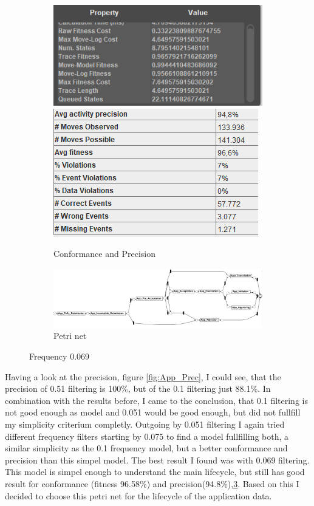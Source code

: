 \begin{figure}[!htbp]
\centering
\begin{subfigure}{.9\textwidth}
  \centering
  \includegraphics[width=0.4\linewidth]{App_Conformance0-069.PNG}
  \includegraphics[width=0.4\linewidth]{App_Precision0-069.PNG}
  \caption{Conformance and Precision}
  \label{fig:APP_Conf0-069}
\end{subfigure}
\begin{subfigure}{\textwidth}
  \centering
  \includegraphics[width=0.9\linewidth]{App_DirectlyFollowedFreq0-069.PNG}
  \caption{Petri net}
  \label{fig:APP_DF0-069}
\end{subfigure}%
\caption{Frequency 0.069}
\label{fig:App_End}
\end{figure}
Having a look at the precision, figure \ref{fig:App_Prec}, I could see, that the precision of 0.51 filtering is 100\%, but of the 0.1 filtering just 88.1\%. In combination with the results before, I came to the conclusion, that 0.1 filtering is not good enough as model and 0.051 would be good enough, but did not fullfill my simplicity criterium completly. Outgoing by 0.051 filtering I again tried different frequency filters starting by 0.075 to find a model fullfilling both, a similar simplicity as the 0.1 frequency model, but a better conformance and precision than this simpel model. The best result I found was with 0.069 filtering. This model is simpel enough to understand the main lifecycle, but still has good result for conformance (fitness 96.58\%) and precision(94.8\%),\ref{fig:App_End}.
Based on this I decided to choose this petri net for the lifecycle of the application data.

